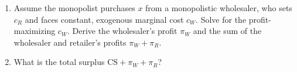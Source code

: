 \documentclass[11pt]{article}
\begin{document}
\begin{enumerate}
         
     \item Assume the monopolist purchases $x$ from a monopolistic wholesaler, who sets $c_R$ and faces constant, exogenous marginal cost $c_W$. Solve for the profit-maximizing $c_W$. Derive the wholesaler's profit $\pi_W$ and the sum of the wholesaler and retailer's profits $\pi_W + \pi_R$.
    
    
     
     \item What is the total surplus $\text{CS} + \pi_W + \pi_R$?
     

\end{enumerate}
\end{document}
